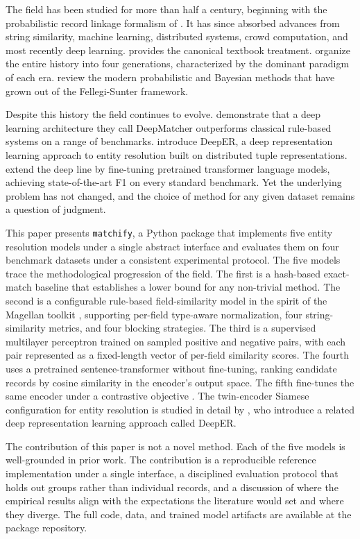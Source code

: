 \documentclass[10pt,letterpaper]{article}
\begin{document}
The field has been studied for more than half a century, beginning
with the probabilistic record linkage formalism of
\citet{fellegi1969}. It has since absorbed advances from string
similarity, machine learning, distributed systems, crowd computation,
and most recently deep learning. \citet{christen2012} provides the
canonical textbook treatment. \citet{papadakis2021} organize the
entire history into four generations, characterized by the dominant
paradigm of each era. \citet{binette2022} review the modern
probabilistic and Bayesian methods that have grown out of the
Fellegi-Sunter framework.

Despite this history the field continues to evolve. \citet{mudgal2018}
demonstrate that a deep learning architecture they call DeepMatcher
outperforms classical rule-based systems on a range of benchmarks.
\citet{ebraheem2018} introduce DeepER, a deep representation learning
approach to entity resolution built on distributed tuple
representations. \citet{li2020} extend the deep line by fine-tuning
pretrained transformer language models, achieving state-of-the-art F1
on every standard benchmark. Yet the underlying problem has not
changed, and the choice of method for any given dataset remains a
question of judgment.

This paper presents \texttt{matchify}, a Python package that
implements five entity resolution models under a single abstract
interface and evaluates them on four benchmark datasets under a
consistent experimental protocol. The five models trace the
methodological progression of the field. The first is a hash-based
exact-match baseline that establishes a lower bound for any
non-trivial method.
The second is a configurable rule-based field-similarity model in the
spirit of the Magellan toolkit \citep{konda2016}, supporting per-field
type-aware normalization, four string-similarity metrics, and four
blocking strategies. The third is a supervised multilayer perceptron
trained on sampled positive and negative pairs, with each pair
represented as a fixed-length vector of per-field similarity scores.
The fourth uses a pretrained sentence-transformer
\citep{reimers2019} without fine-tuning, ranking candidate records by
cosine similarity in the encoder's output space. The fifth fine-tunes
the same encoder under a contrastive objective \citep{hadsell2006}.
The twin-encoder Siamese configuration for entity resolution is
studied in detail by \citet{ebraheem2018}, who introduce a related
deep representation learning approach called DeepER.

The contribution of this paper is not a novel method. Each of the five
models is well-grounded in prior work. The contribution is a
reproducible reference implementation under a single interface, a
disciplined evaluation protocol that holds out groups rather than
individual records, and a discussion of where the empirical results
align with the expectations the literature would set and where they
diverge. The full code, data, and trained model artifacts are
available at the package repository.
\end{document}
